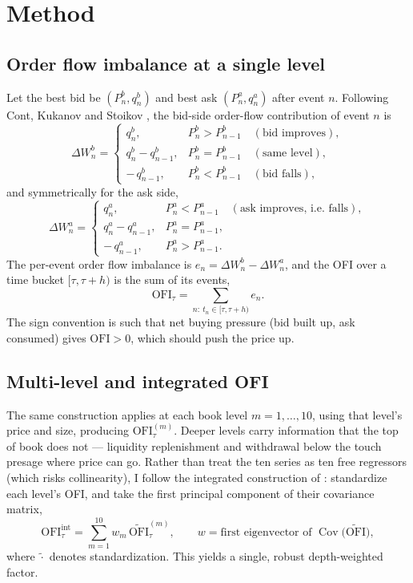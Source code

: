 \documentclass[11pt]{article}
\begin{document}
\section{Method}

\subsection{Order flow imbalance at a single level}
Let the best bid be $(P^b_n, q^b_n)$ and best ask $(P^a_n, q^a_n)$ after event
$n$. Following Cont, Kukanov and Stoikov \cite{cks2014}, the bid-side order-flow
contribution of event $n$ is
\begin{equation}
\Delta W^b_n =
\begin{cases}
q^b_n, & P^b_n > P^b_{n-1} \quad (\text{bid improves}),\\
q^b_n - q^b_{n-1}, & P^b_n = P^b_{n-1} \quad (\text{same level}),\\
-\,q^b_{n-1}, & P^b_n < P^b_{n-1} \quad (\text{bid falls}),
\end{cases}
\end{equation}
and symmetrically for the ask side,
\begin{equation}
\Delta W^a_n =
\begin{cases}
q^a_n, & P^a_n < P^a_{n-1} \quad (\text{ask improves, i.e.\ falls}),\\
q^a_n - q^a_{n-1}, & P^a_n = P^a_{n-1},\\
-\,q^a_{n-1}, & P^a_n > P^a_{n-1}.
\end{cases}
\end{equation}
The per-event order flow imbalance is $e_n = \Delta W^b_n - \Delta W^a_n$, and the
OFI over a time bucket $[\tau, \tau+h)$ is the sum of its events,
\begin{equation}
\mathrm{OFI}_\tau = \sum_{n:\ t_n \in [\tau,\tau+h)} e_n .
\end{equation}
The sign convention is such that net buying pressure (bid built up, ask consumed)
gives $\mathrm{OFI} > 0$, which should push the price up.

\subsection{Multi-level and integrated OFI}
The same construction applies at each book level $m = 1,\dots,10$, using that
level's price and size, producing $\mathrm{OFI}^{(m)}_\tau$. Deeper levels carry
information that the top of book does not --- liquidity replenishment and
withdrawal below the touch presage where price can go. Rather than treat the ten
series as ten free regressors (which risks collinearity), I follow the integrated
construction of \cite{ccz2023}: standardize each level's OFI, and take the first
principal component of their covariance matrix,
\begin{equation}
\mathrm{OFI}^{\mathrm{int}}_\tau = \sum_{m=1}^{10} w_m\, \widetilde{\mathrm{OFI}}^{(m)}_\tau,
\qquad w = \text{first eigenvector of } \operatorname{Cov}\big(\widetilde{\mathrm{OFI}}\big),
\end{equation}
where $\widetilde{\cdot}$ denotes standardization. This yields a single, robust
depth-weighted factor.
\end{document}
